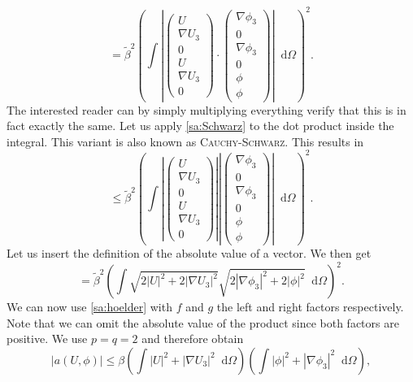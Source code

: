 \documentclass[12pt,a4paper,twoside, open=right]{scrreprt}
\theoremstyle{definition}
\theoremstyle{plain}
\newcommand{\abs}[1]{\left\vert #1\right\vert}
\newcommand{\D}{\mathop{}\!\mathrm{d}}
\begin{document}
\begin{equation}
    =\tilde\beta^2\left(\int\abs{\begin{pmatrix}
        U\\\nabla U_3\\0\\U\\\nabla U_3\\0
        \end{pmatrix}\cdot\begin{pmatrix}
        \nabla\phi_3\\0\\\nabla\phi_3\\0\\\phi\\\phi
        \end{pmatrix}}\D\Omega\right)^2.
\end{equation}
The interested reader can by simply multiplying everything verify that this is in fact exactly the same. Let us apply \ref{sa:Schwarz} to the dot product inside the integral. This variant is also known as \textsc{Cauchy-Schwarz}. This results in 
\begin{equation}
   \le\tilde\beta^2\left(\int\abs{\begin{pmatrix}
       U\\\nabla U_3\\0\\U\\\nabla U_3\\0
       \end{pmatrix}}\abs{\begin{pmatrix}
   \nabla\phi_3\\0\\\nabla\phi_3\\0\\\phi\\\phi
\end{pmatrix}}\D\Omega\right)^2.
\end{equation} 
Let us insert the definition of the absolute value of a vector. We then get
\begin{equation}
    =\tilde\beta^2\left(\int \sqrt{2\abs{U}^2+2\abs{\nabla U_3}^2}\sqrt{2\abs{\nabla\phi_3}^2+2\abs{\phi}^2}\D\Omega\right)^2.
\end{equation}
We can now use \ref{sa:hoelder} with $f$ and $g$ the left and right factors respectively. Note that we can omit the absolute value of the product since both factors are positive. We use $p=q=2$ and therefore obtain
\begin{equation}
    \abs{a(U,\phi)}\le\beta\left(\int\abs{U}^2+\abs{\nabla U_3}^2\D\Omega \right)\left(\int\abs{\phi}^2+\abs{\nabla\phi_3}^2\D\Omega\right),
\end{equation} 
\end{document}

